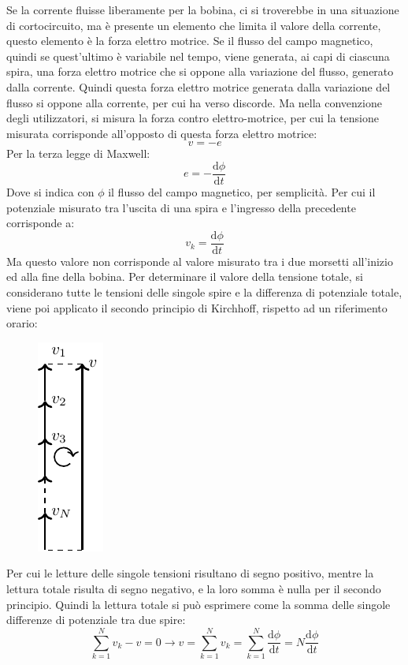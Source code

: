 \documentclass{article}
\newcommand{\df}{\mathrm{d}}
\numberwithin{equation}{subsection}
\begin{document}
Se la corrente fluisse liberamente per la bobina, ci si troverebbe in una situazione di cortocircuito, ma è presente un elemento che limita il valore della corrente, questo 
elemento è la forza elettro motrice. 
Se il flusso del campo magnetico, quindi se quest'ultimo è variabile nel tempo, viene generata, ai capi di ciascuna spira, una forza elettro motrice che si oppone alla variazione 
del flusso, generato dalla corrente. Quindi questa forza elettro motrice generata dalla variazione del flusso si oppone alla corrente, per cui ha verso discorde. Ma nella 
convenzione degli utilizzatori, si misura la forza contro elettro-motrice, per cui la tensione misurata corrisponde all'opposto di questa forza elettro motrice: 
\begin{equation*}
    v=-e
\end{equation*}
Per la terza legge di Maxwell:
\begin{equation*}
    e=-\displaystyle\frac{\df\phi}{\df t}
\end{equation*}
Dove si indica con $\phi$ il flusso del campo magnetico, per semplicità. Per cui il potenziale misurato tra l'uscita di una spira e l'ingresso della precedente corrisponde a:
\begin{equation*}
    v_k=\displaystyle\frac{\df\phi}{\df t}
\end{equation*}
Ma questo valore non corrisponde al valore misurato tra i due morsetti all'inizio ed alla fine della bobina. Per determinare il valore della tensione totale, si considerano 
tutte le tensioni delle singole spire e la differenza di potenziale totale, viene poi applicato il secondo principio di Kirchhoff, rispetto ad un riferimento orario:
\begin{figure}[H]%
    \centering
    \includegraphics{bobina-principio-tensioni.pdf}%
    \label{fig:bobina-principio-tensioni}
\end{figure}
Per cui le letture delle singole tensioni risultano di segno positivo, mentre la lettura totale risulta di segno negativo, e la loro somma è nulla per il secondo principio. 
Quindi la lettura totale si può esprimere come la somma delle singole differenze di potenziale tra due spire:
\begin{equation*}
    \displaystyle\sum_{k=1}^Nv_k-v=0\to v=\sum_{k=1}^Nv_k=\sum_{k=1}^N\frac{\df\phi}{\df t}=N\frac{\df\phi}{\df t}
\end{equation*}
\end{document}
